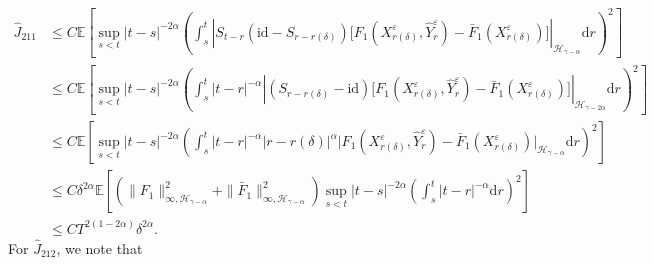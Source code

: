 \documentclass[10pt,a4paper]{article}
\numberwithin{equation}{section}
\begin{document}
\begin{align}\label{K2eta1}
	\hat{J}_{211} & \leq C\mathbb E \left [ \sup_{s<t} |t-s|^{-2\alpha}
	 \left( \int_s^t  \left| S_{t-r}(\mathrm{id}-S_{r-r(\delta)})  \big[F_1(X_{r(\delta)}^\varepsilon,\hat{Y}_r^\varepsilon)-\bar{F}_1(X_{r(\delta)}^\varepsilon) \big] \right|_{\mathcal H_{\gamma-\alpha} } \mathrm{d} r \right)^2  \right ] \nonumber\\
	&\leq C \mathbb E \left [ \sup_{s<t} |t-s|^{-2\alpha} \left(
	\int_s^t |t-r|^{-\alpha}  \left| (S_{r-r(\delta)}-\mathrm{id}) \big[F_1(X_{r(\delta)}^\varepsilon,\hat{Y}_r^\varepsilon)-\bar{F}_1(X_{r(\delta)}^\varepsilon) \big] \right|_{\mathcal H_{\gamma-2\alpha} } \mathrm{d} r \right)^2 \right ] \nonumber\\
	&\leq C \mathbb E \left [ \sup_{s<t} |t-s|^{-2\alpha}
	\left( \int_s^t |t-r|^{-\alpha}  |r-r(\delta)|^\alpha  \big| F_1(X_{r(\delta)}^\varepsilon,\hat{Y}_r^\varepsilon)-\bar{F}_1(X_{r(\delta)}^\varepsilon) \big|_{\mathcal H_{\gamma-\alpha} } \mathrm{d} r \right)^2 \right ] \nonumber\\
	&\leq C \delta^{2\alpha} \mathbb E \left [ \left( \|F_1\|_{\infty, \mathcal H_{\gamma-\alpha}}^2+ \|\bar{F}_1\|_{\infty, \mathcal H_{\gamma-\alpha}}^2 \right)
	\sup_{s<t} |t-s|^{-2\alpha}
	\left(\int_s^t |t-r|^{-\alpha}  \mathrm{d} r\right)^2  \right ] \nonumber\\
	&\leq C T^{2(1-2\alpha)} \delta^{2\alpha}.
\end{align}
For $\hat{J}_{212}$, we note that
\end{document}
